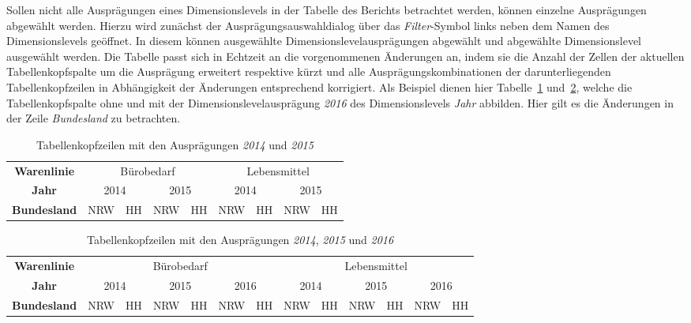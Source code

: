 \documentclass[
  language=german, %
  type=bachelor,%
  ngerman
]{isthesis}
\begin{document}
\begin{content}
  Sollen nicht alle Ausprägungen eines Dimensionslevels in der Tabelle des
  Berichts betrachtet werden, können einzelne Ausprägungen abgewählt werden.
  Hierzu wird zunächst der Ausprägungsauswahldialog über das
  \textit{Filter}-Symbol links neben dem Namen des Dimensionslevels geöffnet.
  In diesem können ausgewählte Dimensionslevelausprägungen abgewählt und abgewählte
  Dimensionslevel ausgewählt werden. Die Tabelle passt sich in Echtzeit an die
  vorgenommenen Änderungen an, indem sie die Anzahl der Zellen der aktuellen
  Tabellenkopfspalte um die Ausprägung erweitert respektive kürzt und alle
  Ausprägungskombinationen der darunterliegenden Tabellenkopfzeilen in
  Abhängigkeit der Änderungen entsprechend korrigiert. Als Beispiel dienen hier
  Tabelle~\ref{table:berichtstabellenkopf20142015}
  und~\ref{table:berichtstabellenkopf201420152016}, welche die Tabellenkopfspalte
  ohne und mit der Dimensionslevelausprägung \textit{2016} des Dimensionslevels
  \textit{Jahr} abbilden. Hier gilt es die Änderungen in der Zeile
  \textit{Bundesland} zu betrachten.

    \begin{table}[]
      \footnotesize
      \begin{tabular}{c c c c c c c c c}
        \textbf{Warenlinie} & \multicolumn{4}{c}{Bürobedarf} & \multicolumn{4}{c}{Lebensmittel} \\
            \cmidrule(lr){2-5}\cmidrule(lr){6-9}
        \textbf{Jahr} & \multicolumn{2}{c}{2014} & \multicolumn{2}{c}{2015} & \multicolumn{2}{c}{2014} & \multicolumn{2}{c}{2015}\\
            \cmidrule(lr){2-3}\cmidrule(lr){4-5}\cmidrule(lr){6-7}\cmidrule(lr){8-9}
        \textbf{Bundesland} & NRW & HH & NRW & HH & NRW & HH & NRW & HH \\
      \end{tabular}
      \caption{Tabellenkopfzeilen mit den Ausprägungen \textit{2014} und \textit{2015}}\label{table:berichtstabellenkopf20142015}
    \end{table}

    \begin{table}
      \footnotesize
      \begin{tabular}{c c c c c c c c c c c c c}
        \textbf{Warenlinie} & \multicolumn{6}{c}{Bürobedarf} & \multicolumn{6}{c}{Lebensmittel} \\
            \cmidrule(lr){2-7}\cmidrule(lr){8-13}
        \textbf{Jahr} & \multicolumn{2}{c}{2014} & \multicolumn{2}{c}{2015} & \multicolumn{2}{c}{2016} & \multicolumn{2}{c}{2014} & \multicolumn{2}{c}{2015} & \multicolumn{2}{c}{2016}\\
            \cmidrule(lr){2-3}\cmidrule(lr){4-5}\cmidrule(lr){6-7}\cmidrule(lr){8-9}\cmidrule(lr){10-11}\cmidrule(lr){12-13}
        \textbf{Bundesland} & NRW & HH & NRW & HH & NRW & HH & NRW & HH & NRW & HH & NRW & HH \\
      \end{tabular}
      \caption{Tabellenkopfzeilen mit den Ausprägungen \textit{2014}, \textit{2015} und \textit{2016}}\label{table:berichtstabellenkopf201420152016}
    \end{table}


\end{content}
\end{document}
